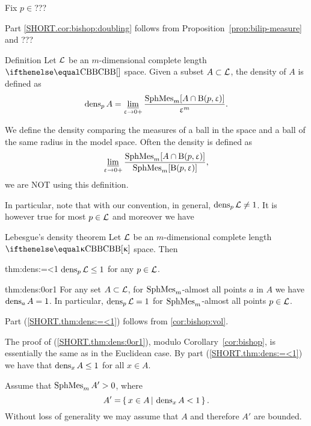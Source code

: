 Fix $p\in$???

Part \ref{SHORT.cor:bishop:doubling} 
follows from Proposition~\ref{prop:bilip-measure} and ???
\qeds

\begin{thm}{Definition}
Let $\mathcal{L}$ be an $m$-dimensional complete length $\Alex{}$ space.
Given a subset $A\subset\spc{L}$, 
the density of $A$ is defined as
\[\dens_p A
=
\liminf_{\eps\to0+}
\frac{\SphMes_m[A\cap \oBall(p,\eps)]}{\eps^{m}}.\]

\end{thm}

We define the density comparing 
the measures of a ball in the space 
and a ball of the same radius in the model space.
Often the density is defined as 
\[\liminf_{\eps\to0+}\frac{\SphMes_m[A\cap\oBall(p,\eps)]}{\SphMes_m[\oBall(p,\eps)]},\]
we are NOT using this definition.

In particular, note that with our convention, in general, $\mathop{\rm dens}\nolimits_p \mathcal{L}\ne1$. It is however true for most $p\in \spc{L}$ and moreover we have






\begin{thm}{Lebesgue's density theorem}\label{thm:dens}
Let $\mathcal{L}$ be an $m$-dimensional complete length $\Alex\kappa$ space.
Then 
\begin{subthm}{thm:dens:=<1}
$\dens_p\spc{L}\le 1$ for any $p\in \spc{L}$.
\end{subthm}

\begin{subthm}{thm:dens:0or1}
For any set $A\subset \spc{L}$,
for 
$\mathop{\rm SphMes}\nolimits_m$-almost all points $a$ in $A$ 
we have
$\mathop{\rm dens}\nolimits_aA=1$. In particular, $\mathop{\rm dens}\nolimits_p\mathcal{L}= 1$ for 
$\mathop{\rm SphMes}\nolimits_m$-almost all points $p\in\spc{L}$.
\end{subthm}

\end{thm}

Part (\ref{SHORT.thm:dens:=<1}) follows from \ref{cor:bishop:vol}.

The proof of (\ref{SHORT.thm:dens:0or1}), 
modulo Corollary~\ref{cor:bishop},
is essentially the same as in the Euclidean case. By part  (\ref{SHORT.thm:dens:=<1})  we have that $\dens_xA\le1$ for all $x\in A$.

Assume that $\mathop{\rm SphMes}\nolimits_m A'>0$,
where 
\[A'=\set{x\in A}{\dens_xA<1}.\]
Without loss of generality we may assume that $A$ 
and therefore $A'$ are bounded.

